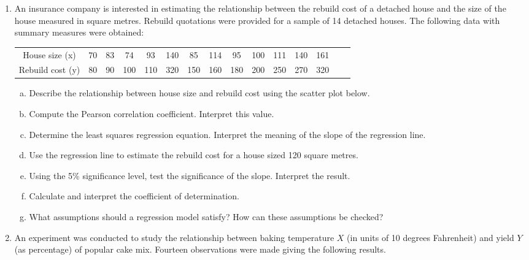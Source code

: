 \documentclass[a4paper,12pt]{article}
\begin{document}
\begin{enumerate}
\item An insurance company is interested in estimating the relationship between the rebuild cost of a detached house and the size of the house measured in square metres. Rebuild quotations were provided for a sample of 14 detached houses. The following data with summary measures were obtained:

\begin{center}
 \begin{tabular}{|c|c|c|c|c|c|c|c|c|c|c|c|c|c|c|}
	\hline
House size (x)  & 70 &  83 & 74 & 93 &  140 &  85 & 114 & 95 & 100 & 111 & 140 & 161 \\ 

Rebuild cost (y) & 80 & 90 & 100 & 110 & 320 & 150 & 160 & 180 & 200 & 250 & 270 & 320 \\
	\hline
\end{tabular}   
\end{center}
\begin{enumerate}[(a)]
\item Describe the relationship between house size and rebuild cost using the scatter plot below.
\item Compute the Pearson correlation coefficient. Interpret this value.
\item Determine the least squares regression equation. Interpret the meaning of the slope of the regression line. 
\item Use the regression line to estimate the rebuild cost for a house sized 120 square metres.
\item Using the 5\% significance level, test the significance of the slope. Interpret the result.
\item Calculate and interpret the coefficient of determination.
\item What assumptions should a regression model satisfy? How can these assumptions be checked?
\end{enumerate}

\item An experiment was conducted to study the relationship between baking temperature $X$ (in units of 10 degrees Fahrenheit) and yield $Y$ (as percentage) of popular cake mix. Fourteen observations were made giving the following results.






\end{enumerate}
\end{document}

